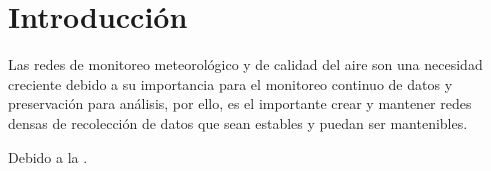 \chapter*{Introducción}\label{introduccion}



Las redes de monitoreo meteorológico y de calidad del aire son una necesidad creciente debido a su importancia para el monitoreo continuo de datos y preservación para análisis, por ello, es el importante crear y mantener redes densas de recolección de datos que sean estables y puedan ser mantenibles.

Debido a la  \cite{muller_sensors_and_the_city}.
